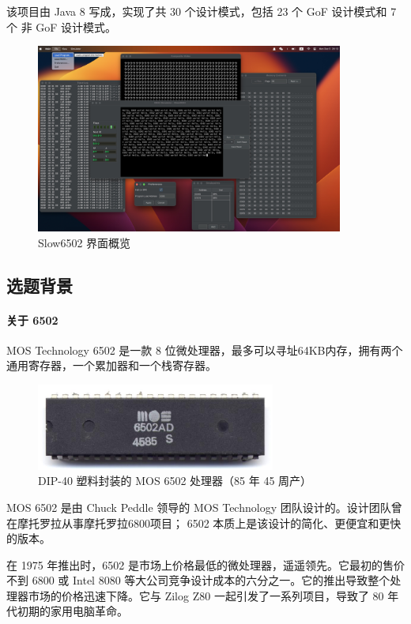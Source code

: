 \documentclass[cn,black,12pt,normal]{elegantnote}
\begin{document}
该项目由 Java 8 写成，实现了共 30 个设计模式，包括 23 个 GoF 设计模式和 7 个 非 GoF 设计模式。

\begin{figure}[H]
  \centering
  \includegraphics[width=0.9\textwidth]{image/Slow6502UI.jpg}
  \caption{Slow6502 界面概览}
\end{figure}

\newpage
\subsection{选题背景}

\paragraph{关于 6502} MOS Technology 6502 是一款 8 位微处理器，最多可以寻址64KB内存，拥有两个通用寄存器，一个累加器和一个栈寄存器。

\begin{figure}[H]
  \centering
  \includegraphics[width=0.7\textwidth]{image/MOS_6502AD_4585_top.jpeg}
  \caption{DIP-40 塑料封装的 MOS 6502 处理器（85 年 45 周产）}
\end{figure}

MOS 6502 是由 Chuck Peddle 领导的 MOS Technology 团队设计的。设计团队曾在摩托罗拉从事摩托罗拉6800项目； 6502 本质上是该设计的简化、更便宜和更快的版本。

在 1975 年推出时，6502 是市场上价格最低的微处理器，遥遥领先。它最初的售价不到 6800 或 Intel 8080 等大公司竞争设计成本的六分之一。它的推出导致整个处理器市场的价格迅速下降。它与 Zilog Z80 一起引发了一系列项目，导致了 80 年代初期的家用电脑革命。
\end{document}
